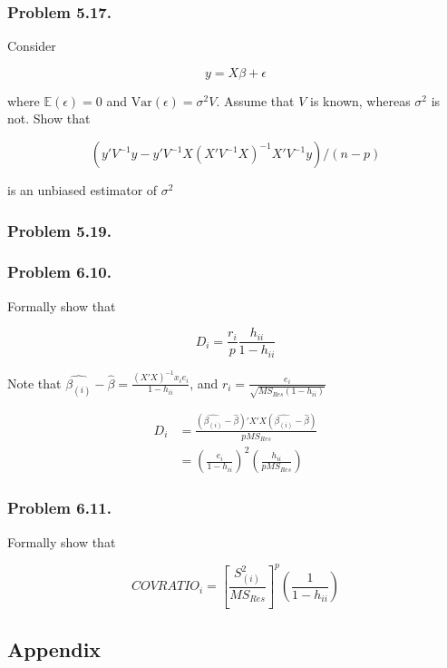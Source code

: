 \documentclass[12pt]{article}
\begin{document}
\subsubsection*{Problem 5.17.} Consider 

$$
y = X\beta + \epsilon
$$

where $\mathbb{E}(\epsilon) = 0$ and $\mathrm{Var}(\epsilon) = \sigma^2V$. Assume that $V$ is known, whereas $\sigma^2$ is not. Show that

$$
(y'V^{-1}y - y'V^{-1}X(X'V^{-1}X)^{-1}X'V^{-1}y)/(n-p)
$$

is an unbiased estimator of $\sigma^2$



\subsubsection*{Problem 5.19.} 



\subsubsection*{Problem 6.10.} Formally show that

$$
D_i = \frac{r_i}{p} \frac{h_{ii}}{1 - h_{ii}}
$$

Note that $\hat{\beta_{(i)}} - \hat{\beta} = \frac{(X'X)^{-1} x_i e_i}{1 - h_{ii}}$, and $r_i = \frac{e_i}{\sqrt{MS_{Res}(1-h_{ii})}}$

$$
\begin{aligned}
D_i &= \frac{(\hat{\beta_{(i)}} - \hat{\beta})' X'X (\hat{\beta_{(i)}} - \hat{\beta})}{pMS_{Res}} \\
&= \left( \frac{e_i}{1-h_{ii}} \right)^2 \left( \frac{h_{ii}}{pMS_{Res}} \right)
\end{aligned}
$$


\subsubsection*{Problem 6.11.} Formally show that

$$
COVRATIO_i = \left[ \frac{S_{(i)}^2}{MS_{Res}} \right]^p \left( \frac{1}{1 - h_{ii}} \right)
$$



\pagebreak
\subsection*{Appendix}
\end{document}
